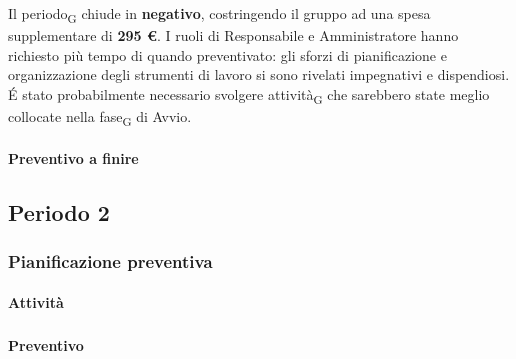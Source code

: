 Il periodo\textsubscript{G} chiude in \textbf{negativo}, costringendo il gruppo ad una spesa supplementare di \textbf{295 \euro}. I ruoli di Responsabile e Amministratore hanno richiesto più tempo di quando preventivato: gli sforzi di pianificazione e organizzazione degli strumenti di lavoro si sono rivelati impegnativi e dispendiosi. \'E stato probabilmente necessario svolgere attività\textsubscript{G} che sarebbero state meglio collocate nella fase\textsubscript{G} di Avvio.



\paragraph{Preventivo a finire}
\subparagraph*{}

\pafTable{
	
}

\pagebreak
\subsection{Periodo 2}

\subsubsection{Pianificazione preventiva}

\paragraph{Attività}
\subparagraph*{}

\planningTable{
	
}



\paragraph{Preventivo}
\subparagraph*{}

